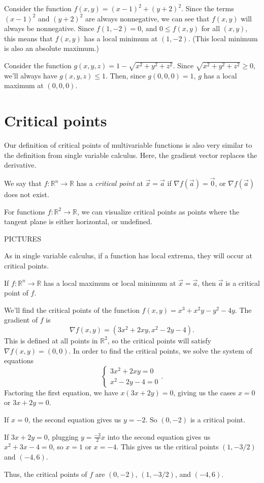 \documentclass{ximera}
\begin{document}
\begin{example}
Consider the function $f(x,y)= (x-1)^2 + (y+2)^2$. Since the terms $(x-1)^2$ and $(y+2)^2$ are always nonnegative, we can see that $f(x,y)$ will always be nonnegative. Since $f(1,-2)=0$, and $0\leq f(x,y)$ for all $(x,y)$, this means that $f(x,y)$ has a local minimum at $(1,-2)$. (This local minimum is also an absolute maximum.)

Consider the function $g(x,y,z) = 1-\sqrt{x^2+y^2+z^2}$. Since $\sqrt{x^2+y^2+z^2}\geq 0$, we'll always have $g(x,y,z) \leq 1$. Then, since $g(0,0,0)=1$, $g$ has a local maximum at $(0,0,0)$.
\end{example}

\section*{Critical points}

Our definition of critical points of multivariable functions is also very similar to the definition from single variable calculus. Here, the gradient vector replaces the derivative.

\begin{definition}
We say that $f:\mathbb{R}^n\rightarrow\mathbb{R}$ has a \emph{critical point} at $\vec{x}=\vec{a}$ if $\nabla f(\vec{a})=\vec{0}$, or $\nabla f(\vec{a})$ does not exist.
\end{definition}

For functions $f:\mathbb{R}^2\rightarrow\mathbb{R}$, we can visualize critical points as points where the tangent plane is either horizontal, or undefined.

PICTURES

As in single variable calculus, if a function has local extrema, they will occur at critical points.

\begin{proposition}
If $f:\mathbb{R}^n\rightarrow\mathbb{R}$ has a local maximum or local minimum at $\vec{x}=\vec{a}$, then $\vec{a}$ is a critical point of $f$.
\end{proposition}

\begin{example}
We'll find the critical points of the function $f(x,y) = x^3+x^2y-y^2-4y$. The gradient of $f$ is
\[
\nabla f(x,y) = (3x^2+2xy, x^2-2y-4).
\]
This is defined at all points in $\mathbb{R}^2$, so the critical points will satisfy $\nabla f(x,y)=(0,0)$. In order to find the critical points, we solve the system of equations
\[\begin{cases}
3x^2+2xy=0\\
x^2-2y-4=0
\end{cases}.\]
Factoring the first equation, we have $x(3x+2y)=0$, giving us the cases $x=0$ or $3x+2y=0$.

If $x=0$, the second equation gives us $y=-2$. So $(0,-2)$ is a critical point.

If $3x+2y=0$, plugging $y=\frac{-3}{2} x$ into the second equation gives us $x^2+3x-4=0$, so $x=1$ or $x=-4$. This gives us the critical points $(1,-3/2)$ and $(-4,6)$.

Thus, the critical points of $f$ are $(0,-2)$, $(1,-3/2)$, and $(-4,6)$.
\end{example}
\end{document}
